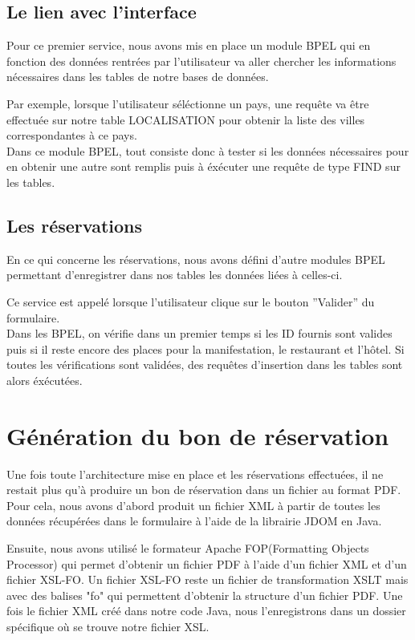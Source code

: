 \documentclass[11pt,a4paper]{article}
\begin{document}
\subsection{Le lien avec l'interface}
Pour ce premier service, nous avons mis en place un module BPEL qui en fonction
des données rentrées par l'utilisateur va aller chercher les informations
nécessaires dans les tables de notre bases de données. 

Par exemple, lorsque l'utilisateur séléctionne un pays, une requête va être
effectuée sur notre table LOCALISATION pour obtenir la liste des villes
correspondantes à ce pays.\\

Dans ce module BPEL, tout consiste donc à tester si les données nécessaires
pour en obtenir une autre sont remplis puis à éxécuter une requête de type FIND
sur les tables.

\subsection{Les réservations}
En ce qui concerne les réservations, nous avons défini d'autre modules BPEL
permettant d'enregistrer dans nos tables les données liées à celles-ci.

Ce service est appelé lorsque l'utilisateur clique sur le bouton ''Valider''
du formulaire.\\ 

Dans les BPEL, on vérifie dans un premier temps si les ID fournis sont valides
puis si il reste encore des places pour la manifestation, le restaurant et
l'hôtel. Si toutes les vérifications sont validées, des requêtes d'insertion
dans les tables sont alors éxécutées.


\section{Génération du bon de réservation}
Une fois toute l'architecture mise en place et les réservations effectuées, il
ne restait plus qu'à produire un bon de réservation dans un fichier au format
PDF.\\

Pour cela, nous avons d'abord produit un fichier XML à partir de toutes les
données récupérées dans le formulaire à l'aide de la librairie JDOM en
Java. 

Ensuite, nous avons utilisé le formateur Apache FOP(Formatting Objects
Processor) qui permet d'obtenir un fichier PDF à l'aide d'un fichier XML et d'un
fichier XSL-FO. Un fichier XSL-FO reste un fichier de transformation XSLT mais
avec des balises "fo" qui permettent d'obtenir la structure d'un fichier PDF.
Une fois le fichier XML créé dans notre code Java, nous l'enregistrons dans un
dossier spécifique où se trouve notre fichier XSL.
\end{document}
